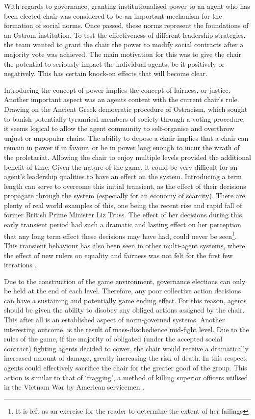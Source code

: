 With regards to governance, granting institutionalised power to an agent who has been elected chair was considered to be an important mechanism for the formation of social norms. Once passed, these norms represent the foundations of an Ostrom institution. To test the effectiveness of different leadership strategies, the team wanted to grant the chair the power to modify social contracts after a majority vote was achieved. The main motivation for this was to give the chair the potential to seriously impact the individual agents, be it positively or negatively. This has certain knock-on effects that will become clear. 

Introducing the concept of power implies the concept of fairness, or justice. Another important aspect was an agents content with the current chair's rule. Drawing on the Ancient Greek democratic procedure of Ostracism, which sought to banish potentially tyrannical members of society through a voting procedure, it seems logical to allow the agent community to self-organise and overthrow unjust or unpopular chairs. The ability to depose a chair implies that a chair can remain in power if in favour, or be in power long enough to incur the wrath of the proletariat. Allowing the chair to enjoy multiple levels provided the additional benefit of time. Given the nature of the game, it could be very difficult for an agent's leadership qualities to have an effect on the system. Introducing a term length can serve to overcome this initial transient, as the effect of their decisions propagate through the system (especially for an economy of scarcity). There are plenty of real world examples of this, one being the recent rise and rapid fall of former British Prime Minister Liz Truss. The effect of her decisions during this early transient period had such a dramatic and lasting effect on her perception that any long term effect these decisions may have had, could never be seen\footnote{It is left as an exercise for the reader to determine the extent of her failings}. This transient behaviour has also been seen in other multi-agent systems, where the effect of new rulers on equality and fairness was not felt for the first few iterations \cite{Kirka2018}. 

Due to the construction of the game environment, governance elections can only be held at the end of each level. Therefore, any poor collective action decisions can have a sustaining and potentially game ending effect. For this reason, agents should be given the ability to disobey any obliged actions assigned by the chair. This after all is an established aspect of norm-governed systems. Another interesting outcome, is the result of mass-disobedience mid-fight level. Due to the rules of the game, if the majority of obligated (under the accepted social contract) fighting agents decided to cower, the chair would receive a dramatically increased amount of damage, greatly increasing the risk of death. In this respect, agents could effectively sacrifice the chair for the greater good of the group. This action is similar to that of `fragging', a method of killing superior officers utilised in the Vietnam War by American servicemen \cite{frag}.

